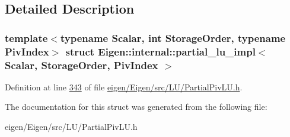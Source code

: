 \subsection{Detailed Description}
\subsubsection*{template$<$typename Scalar, int Storage\+Order, typename Piv\+Index$>$\newline
struct Eigen\+::internal\+::partial\+\_\+lu\+\_\+impl$<$ Scalar, Storage\+Order, Piv\+Index $>$}



Definition at line \hyperlink{eigen_2_eigen_2src_2_l_u_2_partial_piv_l_u_8h_source_l00343}{343} of file \hyperlink{eigen_2_eigen_2src_2_l_u_2_partial_piv_l_u_8h_source}{eigen/\+Eigen/src/\+L\+U/\+Partial\+Piv\+L\+U.\+h}.



The documentation for this struct was generated from the following file\+:\begin{DoxyCompactItemize}
\item 
eigen/\+Eigen/src/\+L\+U/\+Partial\+Piv\+L\+U.\+h\end{DoxyCompactItemize}
